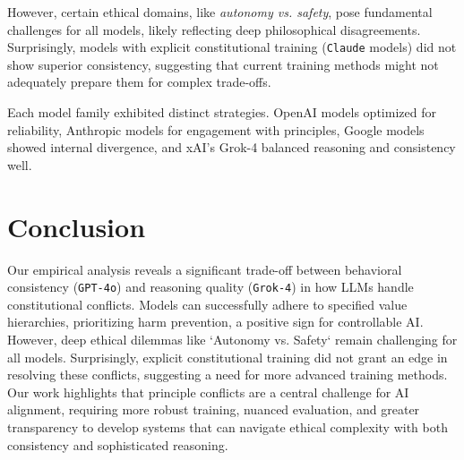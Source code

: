 \documentclass[10pt,a4paper]{article}
\newcommand{\model}[1]{\texttt{#1}}
\newcommand{\principle}[1]{\textit{#1}}
\begin{document}
However, certain ethical domains, like \principle{autonomy vs. safety}, pose fundamental challenges for all models, likely reflecting deep philosophical disagreements. Surprisingly, models with explicit constitutional training (\model{Claude} models) did not show superior consistency, suggesting that current training methods might not adequately prepare them for complex trade-offs.

Each model family exhibited distinct strategies. OpenAI models optimized for reliability, Anthropic models for engagement with principles, Google models showed internal divergence, and xAI's Grok-4 balanced reasoning and consistency well.

\section{Conclusion}
Our empirical analysis reveals a significant trade-off between behavioral consistency (\model{GPT-4o}) and reasoning quality (\model{Grok-4}) in how LLMs handle constitutional conflicts. Models can successfully adhere to specified value hierarchies, prioritizing harm prevention, a positive sign for controllable AI. However, deep ethical dilemmas like `Autonomy vs. Safety` remain challenging for all models. Surprisingly, explicit constitutional training did not grant an edge in resolving these conflicts, suggesting a need for more advanced training methods. Our work highlights that principle conflicts are a central challenge for AI alignment, requiring more robust training, nuanced evaluation, and greater transparency to develop systems that can navigate ethical complexity with both consistency and sophisticated reasoning.

\clearpage
\printbibliography
\end{document}
